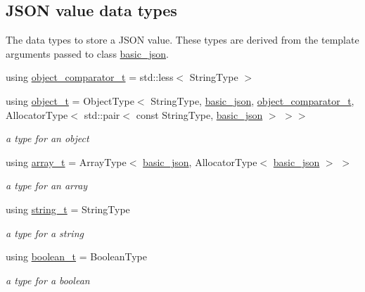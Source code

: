 \subsection*{J\+S\+ON value data types}
\label{_amgrpbddfba6d49869d59bfd397e65b8cba87}%
The data types to store a J\+S\+ON value. These types are derived from the template arguments passed to class \hyperlink{classnlohmann_1_1basic__json}{basic\+\_\+json}. \begin{DoxyCompactItemize}
\item 
using \hyperlink{classnlohmann_1_1basic__json_abed9e77c5fcfc925fcdd489911069c3b}{object\+\_\+comparator\+\_\+t} = std\+::less$<$ String\+Type $>$
\item 
using \hyperlink{classnlohmann_1_1basic__json_a5e48a7893520e1314bf0c9723e26ea2a}{object\+\_\+t} = Object\+Type$<$ String\+Type, \hyperlink{classnlohmann_1_1basic__json}{basic\+\_\+json}, \hyperlink{classnlohmann_1_1basic__json_abed9e77c5fcfc925fcdd489911069c3b}{object\+\_\+comparator\+\_\+t}, Allocator\+Type$<$ std\+::pair$<$ const String\+Type, \hyperlink{classnlohmann_1_1basic__json}{basic\+\_\+json} $>$ $>$$>$
\begin{DoxyCompactList}\small\item\em a type for an object \end{DoxyCompactList}\item 
using \hyperlink{classnlohmann_1_1basic__json_ae095578e03df97c5b3991787f1056374}{array\+\_\+t} = Array\+Type$<$ \hyperlink{classnlohmann_1_1basic__json}{basic\+\_\+json}, Allocator\+Type$<$ \hyperlink{classnlohmann_1_1basic__json}{basic\+\_\+json} $>$ $>$
\begin{DoxyCompactList}\small\item\em a type for an array \end{DoxyCompactList}\item 
using \hyperlink{classnlohmann_1_1basic__json_a61f8566a1a85a424c7266fb531dca005}{string\+\_\+t} = String\+Type
\begin{DoxyCompactList}\small\item\em a type for a string \end{DoxyCompactList}\item 
using \hyperlink{classnlohmann_1_1basic__json_a4c919102a9b4fe0d588af64801436082}{boolean\+\_\+t} = Boolean\+Type
\begin{DoxyCompactList}\small\item\em a type for a boolean \end{DoxyCompactList}\item 
$$
\end{DoxyCompactItemize}
